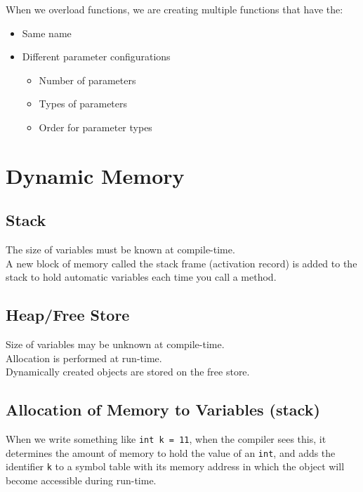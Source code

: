 \documentclass{article}
\begin{document}
	When we overload functions, we are creating multiple functions that have the: \vspace{-1mm}
	\begin{itemize}
		\item Same name
		\item Different parameter configurations \vspace{-1mm}
			\begin{itemize}
				\item Number of parameters
				\item Types of parameters
				\item Order for parameter types
			\end{itemize}
	\end{itemize}
	
	
	\section{Dynamic Memory}
	
	\subsection*{Stack}
	
	The size of variables must be known at compile-time.\\
	
	A new block of memory called the stack frame (activation record) is added to the stack to hold automatic variables each time you call a method. 
	
	\subsection*{Heap/Free Store}
	
	Size of variables may be unknown at compile-time.\\
	
	Allocation is performed at run-time.\\
	
	Dynamically created objects are stored on the free store.
	
	\subsection{Allocation of Memory to Variables (stack)}
	
	When we write something like \verb|int k = 11|, when the compiler sees this, it determines the amount of memory to hold the value of an \verb|int|, and adds the identifier \verb|k| to a symbol table with its memory address in which the object will become accessible during run-time.\\
	
\end{document}
